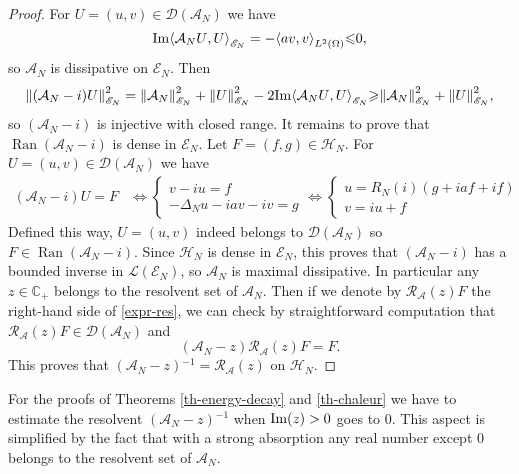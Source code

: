\documentclass[10pt, a4paper,reqno]{amsart}
\theoremstyle{plain}
\theoremstyle{definition}
\theoremstyle{remark}
\begin{document}
\begin{proof}
For $U = (u,v) \in {{\mathcal D}}({{{\mathcal A}}_N})$ we have 
\[
{\mathop{\rm{Im}}\nolimits} {\left< {{{{\mathcal A}}_N} U} , {U} \right>}_{\mathscr E_N} = - {\left< {av} , v \right>}_{L^2({\Omega})} {\leqslant} 0,
\]
so ${{{\mathcal A}}_N}$ is dissipative on ${\mathscr E_N}$. Then
\[
{\left\Vert {({{{\mathcal A}}_N}-i)U}\right\Vert}_{\mathscr E_N}^2 = {\left\Vert {{{\mathcal A}}_N}\right\Vert}_{\mathscr E_N}^2 + {\left\Vert {U}\right\Vert}_{\mathscr E_N}^2 - 2 {\mathop{\rm{Im}}\nolimits} {\left< {{{{\mathcal A}}_N} U} , {U} \right>}_{\mathscr E_N} {\geqslant} {\left\Vert {{{\mathcal A}}_N}\right\Vert}_{\mathscr E_N}^2 + {\left\Vert {U}\right\Vert}_{\mathscr E_N}^2,
\]
so $({{{\mathcal A}}_N}-i)$ is injective with closed range. It remains to prove that $\operatorname{Ran}({{{\mathcal A}}_N}-i)$ is dense in ${\mathscr E_N}$. Let $F = (f,g) \in {\mathcal H_N}$. For $U =(u,v) \in {{\mathcal D}}({{{\mathcal A}}_N})$ we have 
\begin{align*}
({{{\mathcal A}}_N}-i)U = F
& {\Longleftrightarrow} 
\begin{cases}
v-iu = f \\
- {{\Delta}_N} u - i a v - i v= g
\end{cases}
{\Longleftrightarrow}
\begin{cases}
u = {R_N}(i) (g+iaf+if)\\
v = iu + f 
\end{cases}
\end{align*}
Defined this way, $U = (u,v)$ indeed belongs to ${{\mathcal D}}({{{\mathcal A}}_N})$ so $F \in \operatorname{Ran}({{{\mathcal A}}_N}-i)$. Since ${\mathcal H_N}$ is dense in ${\mathscr E_N}$, this proves that $({{{\mathcal A}}_N}-i)$ has a bounded inverse in ${{\mathcal L}}({\mathscr E_N})$, so ${{{\mathcal A}}_N}$ is maximal dissipative.
In particular any $z \in {\mathbb{C}}_+$ belongs to the resolvent set of ${{{\mathcal A}}_N}$. Then if we denote by ${{\mathcal R}}_{{\mathcal A}}(z) F$ the right-hand side of \eqref{expr-res}, we can check by straightforward computation that ${{\mathcal R}}_{{\mathcal A}}(z) F \in {{\mathcal D}}({{{\mathcal A}}_N})$ and
\[
({{{\mathcal A}}_N}-z) {{\mathcal R}}_{{\mathcal A}}(z) F = F.
\]
This proves that $({{{\mathcal A}}_N} - z){^{-1}} = {{\mathcal R}}_{{\mathcal A}}(z)$ on ${\mathcal H_N}$.
\end{proof}

For the proofs of Theorems \ref{th-energy-decay} and \ref{th-chaleur} we have to estimate the resolvent $({{{\mathcal A}}_N}-z){^{-1}}$ when ${\mathop{\rm{Im}}\nolimits}(z) > 0$ goes to 0. This aspect is simplified by the fact that with a strong absorption any real number except 0 belongs to the resolvent set of ${{{\mathcal A}}_N}$.
\end{document}
